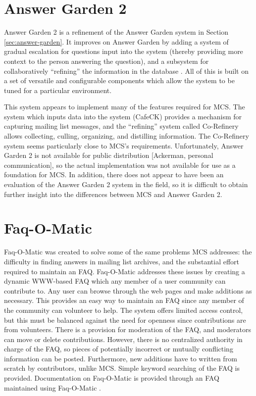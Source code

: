 \section{Answer Garden 2}
Answer Garden 2 is a refinement of the Answer Garden system in Section
\ref{sec:answer-garden}. It improves on Answer Garden by adding a system of
gradual escalation for questions input into the system (thereby providing more
context to the person answering the question), and a subsystem for
collaboratively ``refining'' the information in the database \cite{cscw96*97}.
All of this is built on a set of versatile and configurable components which
allow the system to be tuned for a particular environment.

This system appears to implement many of the features required for MCS.  The
system which inputs data into the system (CafeCK) provides a mechanism for
capturing mailing list messages, and the ``refining'' system called Co-Refinery
allows collecting, culling, organizing, and distilling information. The
Co-Refinery system seems particularly close to MCS's requirements.
Unfortunately, Answer Garden 2 is not available for public distribution
[Ackerman, personal communication], so the actual implementation was not
available for use as a foundation for MCS. In addition, there does not appear
to have been an evaluation of the Answer Garden 2 system in the field, so it is
difficult to obtain further insight into the differences between MCS and Answer
Garden 2.

\section{Faq-O-Matic}
Faq-O-Matic was created to solve some of the same problems MCS addresses: the
difficulty in finding answers in mailing list archives, and the substantial
effort required to maintain an FAQ. Faq-O-Matic addresses these issues by
creating a dynamic WWW-based FAQ which any member of a user community can
contribute to. Any user can browse through the web pages and make additions as
necessary. This provides an easy way to maintain an FAQ since any member of the
community can volunteer to help. The system offers limited access control, but
this must be balanced against the need for openness since contributions are
from volunteers. There is a provision for moderation of the FAQ, and moderators
can move or delete contributions. However, there is no centralized authority in
charge of the FAQ, so pieces of potentially incorrect or mutually conflicting
information can be posted. Furthermore, new additions have to written from
scratch by contributors, unlike MCS. Simple keyword searching of the FAQ is
provided.  Documentation on Faq-O-Matic is provided through an FAQ maintained
using Faq-O-Matic \cite{faq-o-matic-website}.

